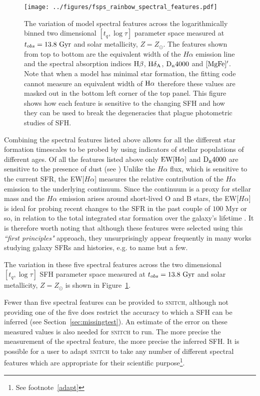\documentclass[useAMS,usenatbib]{mn2e}
\def\referee		{\color{refer}}
\begin{document}
\begin{figure}
\centering
\texttt{[image: ../figures/fsps\_rainbow\_spectral\_features.pdf]}
\caption{The variation of model spectral features across the logarithmically binned two dimensional $[t_q, \log \tau]$ parameter space measured at $t_{obs}=13.8~\rm{Gyr}$ and solar metallicity, $Z=Z_{\odot}$. The features shown from top to bottom are the equivalent width of the $H\alpha$ emission line and the spectral absorption indices $\rm{H}\beta$, $\rm{H}\delta_A$, $\rm{D}_n4000$ and $[\rm{MgFe}]^{\prime}$. Note that when a model has minimal star formation, the fitting code cannot measure an equivalent width of $\rm{H}\alpha$ therefore these values are masked out in the bottom left corner of the top panel. This figure shows how each feature is sensitive to the changing SFH and how they can be used to break the degeneracies that plague photometric studies of SFH. }
\label{fig:rainbow}
\end{figure}

{\referee Combining the spectral features listed above allows for all the different star formation timescales to be probed by using indicators of stellar populations of different ages. Of all the features listed above only $\rm{EW}[H\alpha]$ and $\rm{D}_n4000$ are sensitive to the presence of dust (see \citealt{balogh99})} {\referee Unlike the $H\alpha$ flux, which is sensitive to the current SFR, the EW[$H\alpha$] measures the relative contribution of the $H\alpha$ emission to the underlying continuum. Since the continuum is a proxy for stellar mass and the $H\alpha$ emission arises around short-lived O and B stars, the EW[$H\alpha$] is ideal for probing recent changes to the SFR in the past couple of $100$ Myr or so, in relation to the total integrated star formation over the galaxy’s lifetime \citep[see also][]{li15, zick18}.} It is therefore worth noting that although these features were selected using this \emph{``first principles"} approach, they unsurprisingly appear frequently in many works studying galaxy SFRs and histories, e.g. \cite{kauffmann03, brinchmann04, goto05b, moustakas06, martin07, huang13, li15, wang18, spindler18, zick18} to name but a few. 

The variation in these five spectral features across the two dimensional $[t_q, \log \tau]$ SFH parameter space measured at $t_{obs}=13.8~\rm{Gyr}$ and solar metallicity, $Z=Z_{\odot}$ is shown in Figure~\ref{fig:rainbow}.


Fewer than five spectral features can be provided to \textsc{snitch}, although not providing one of the five does restrict the accuracy to which a SFH can be inferred (see Section~\ref{sec:missingtest}). An estimate of the error on these measured values is also needed for \textsc{snitch} to run. The more precise the measurement of the spectral feature, the more precise the inferred SFH. It is possible for a user to adapt \textsc{snitch} to take any number of different spectral features which are appropriate for their scientific purpose\footnote{See footnote~\ref{adapt}}.
\end{document}
